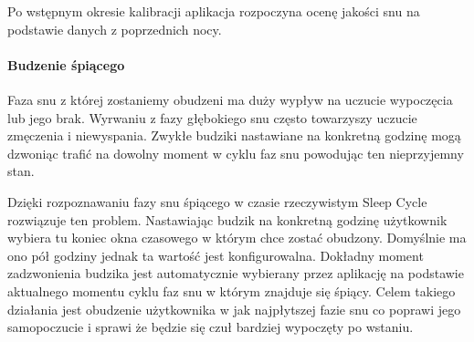 Po wstępnym okresie kalibracji aplikacja rozpoczyna ocenę jakości snu na podstawie danych z poprzednich nocy.


\paragraph{Budzenie śpiącego}
Faza snu z której zostaniemy obudzeni ma duży wypływ na uczucie wypoczęcia lub jego brak. Wyrwaniu z fazy głębokiego snu często towarzyszy uczucie zmęczenia i niewyspania. Zwykłe budziki nastawiane na konkretną godzinę mogą dzwoniąc trafić na dowolny moment w cyklu faz snu powodując ten nieprzyjemny stan. 

Dzięki rozpoznawaniu fazy snu śpiącego w czasie rzeczywistym Sleep Cycle rozwiązuje ten problem. Nastawiając budzik na konkretną godzinę użytkownik wybiera tu koniec okna czasowego w którym chce zostać obudzony. Domyślnie ma ono pół godziny jednak ta wartość jest konfigurowalna. Dokładny moment zadzwonienia budzika jest automatycznie wybierany przez aplikację na podstawie aktualnego momentu cyklu faz snu w którym znajduje się śpiący. Celem takiego działania jest obudzenie użytkownika w jak najpłytszej fazie snu co poprawi jego samopoczucie i sprawi że będzie się czuł bardziej wypoczęty po wstaniu.
